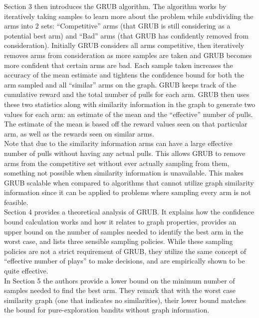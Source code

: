 \documentclass{article}[12pt]
\begin{document}
Section 3 then introduces the GRUB algorithm.
The algorithm works by iteratively taking samples to learn more about the problem while subdividing the arms into 2 sets:
“Competitive” arms (that GRUB is still considering as a potential best arm) and “Bad” arms (that GRUB has confidently removed from consideration).
Initially GRUB considers all arms competitive, then iteratively removes arms from consideration as more samples are taken and GRUB becomes more confident that certain arms are bad.
Each sample taken increases the accuracy of the mean estimate and tightens the confidence bound for both the arm sampled and all “similar” arms on the graph.
GRUB keeps track of the cumulative reward and the total number of pulls for each arm.
GRUB then uses these two statistics along with similarity information in the graph to generate two values for each arm: an estimate of the mean and the “effective” number of pulls.
The estimate of the mean is based off the reward values seen on that particular arm, as well as the rewards seen on similar arms. \\

Note that due to the similarity information arms can have a large effective number of pulls without having any actual pulls.
This allows GRUB to remove arms from the competitive set without ever actually sampling from them, something not possible when similarity information is unavailable.
This makes GRUB scalable when compared to algorithms that cannot utilize graph similarity information since it can be applied to problems where sampling every arm is not feasible. \\

Section 4 provides a theoretical analysis of GRUB.
It explains how the confidence bound calculation works and how it relates to graph properties,
provides an upper bound on the number of samples needed to identify the best arm in the worst case,
and lists three sensible sampling policies.
While these sampling policies are not a strict requirement of GRUB,
they utilize the same concept of “effective number of plays” to make decisions,
and are empirically shown to be quite effective. \\

In Section 5 the authors provide a lower bound on the minimum number of samples needed to find the best arm.
They remark that with the worst case similarity graph (one that indicates no similarities),
their lower bound matches the bound for pure-exploration bandits without graph information. \\
\end{document}

